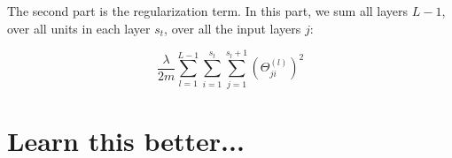 The second part is the regularization term. In this part, we sum all layers $L-1$, over all units in each layer $s_t$, over all the input layers $j$:

\[
    \frac{\lambda}{2m}\sum_{l=1}^{L-1}\sum_{i=1}^{s_t}\sum_{j=1}^{s_l+1}(\Theta_{ji}^{(l)})^2
\]

\section{Learn this better...}



%

